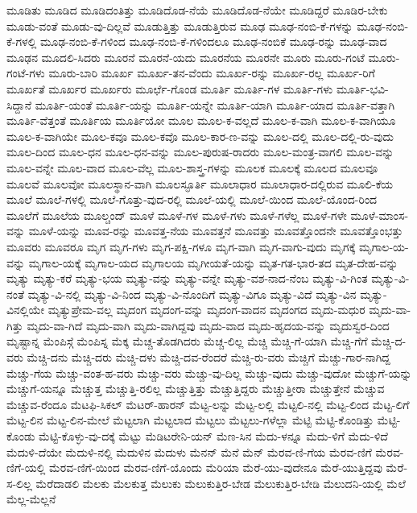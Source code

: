 {ಮೂಡಿತು
ಮೂಡಿದ
ಮೂಡಿದಂತಿತ್ತು
ಮೂಡಿದೊಡ-ನೆಯೆ
ಮೂಡಿದೊಡ-ನೆಯೇ
ಮೂಡಿದ್ದರೆ
ಮೂಡಿರ-ಬೇಕು
ಮೂಡು-ವಂತೆ
ಮೂಡು-ವು-ದಿಲ್ಲವೆ
ಮೂಡುತ್ತಿತ್ತು
ಮೂಡುತ್ತಿರುವ
ಮೂಢ
ಮೂಢ-ನಂಬಿ-ಕೆ-ಗಳನ್ನು
ಮೂಢ-ನಂಬಿ-ಕೆ-ಗಳಲ್ಲಿ
ಮೂಢ-ನಂಬಿ-ಕೆ-ಗಳಿಂದ
ಮೂಢ-ನಂಬಿ-ಕೆ-ಗಳಿಂದಲೂ
ಮೂಢ-ನಂಬಿಕೆ
ಮೂಢ-ರನ್ನು
ಮೂಢ-ವಾದ
ಮೂಢನ
ಮೂದಲಿ-ಸಿದರು
ಮೂರನೆ
ಮೂರನೆ-ಯದು
ಮೂರನೆಯ
ಮೂರನೇ
ಮೂರು
ಮೂರು-ಗಂಟೆ
ಮೂರು-ಗಂಟೆ-ಗಳು
ಮೂರು-ಬಾರಿ
ಮೂರ್ಖ
ಮೂರ್ಖ-ತನ-ವೆಂದು
ಮೂರ್ಖ-ರನ್ನು
ಮೂರ್ಖ-ರಲ್ಲ
ಮೂರ್ಖ-ರಿಗೆ
ಮೂರ್ಖತೆ
ಮೂರ್ಖರ
ಮೂರ್ಖರು
ಮೂರ್ಛೆ-ಗೊಂಡ
ಮೂರ್ತಿ
ಮೂರ್ತಿ-ಗಳ
ಮೂರ್ತಿ-ಗಳು
ಮೂರ್ತಿ-ಭವಿ-ಸಿದ್ದಾನೆ
ಮೂರ್ತಿ-ಯಂತೆ
ಮೂರ್ತಿ-ಯನ್ನು
ಮೂರ್ತಿ-ಯನ್ನೇ
ಮೂರ್ತಿ-ಯಾಗಿ
ಮೂರ್ತಿ-ಯಾದ
ಮೂರ್ತಿ-ವತ್ತಾಗಿ
ಮೂರ್ತಿ-ವೆತ್ತಂತೆ
ಮೂರ್ತಿಯ
ಮೂರ್ತಿಯೋ
ಮೂಲ
ಮೂಲ-ಕ-ವಲ್ಲದೆ
ಮೂಲ-ಕ-ವಾಗಿ
ಮೂಲ-ಕ-ವಾಗಿಯೂ
ಮೂಲ-ಕ-ವಾಗಿಯೇ
ಮೂಲ-ಕವೂ
ಮೂಲ-ಕವೊ
ಮೂಲ-ಕಾರ-ಣ-ವನ್ನು
ಮೂಲ-ದಲ್ಲಿ
ಮೂಲ-ದಲ್ಲಿ-ರು-ವುದು
ಮೂಲ-ದಿಂದ
ಮೂಲ-ಧನ
ಮೂಲ-ಧನ-ವನ್ನು
ಮೂಲ-ಪುರುಷ-ರಾದರು
ಮೂಲ-ಮಂತ್ರ-ವಾಗಲಿ
ಮೂಲ-ವನ್ನು
ಮೂಲ-ವನ್ನೇ
ಮೂಲ-ವಾದ
ಮೂಲ-ವೆಲ್ಲ
ಮೂಲ-ಶಾಸ್ತ್ರ-ಗಳನ್ನು
ಮೂಲಕ
ಮೂಲಕ್ಕೆ
ಮೂಲದ
ಮೂಲವೂ
ಮೂಲವೆ
ಮೂಲವೋ
ಮೂಲಸ್ಥಾನ-ವಾಗಿ
ಮೂಲಸ್ಫೂರ್ತಿ
ಮೂಲಾಧಾರ
ಮೂಲಾಧಾರ-ದಲ್ಲಿರುವ
ಮೂಲಿ-ಕೆಯ
ಮೂಲೆ
ಮೂಲೆ-ಗಳಲ್ಲಿ
ಮೂಲೆ-ಗೊತ್ತು-ವುದ-ರಲ್ಲಿ
ಮೂಲೆ-ಯಲ್ಲಿ
ಮೂಲೆ-ಯಿಂದ
ಮೂಲೆ-ಯೊಂದ-ರಿಂದ
ಮೂಲೆಗೆ
ಮೂಲೆಯ
ಮೂಲ್ಚಂದ್
ಮೂಳೆ
ಮೂಳೆ-ಗಳ
ಮೂಳೆ-ಗಳು
ಮೂಳೆ-ಗಳೆಲ್ಲ
ಮೂಳೆ-ಗಳೇ
ಮೂಳೆ-ಮಾಂಸ-ವನ್ನು
ಮೂಳೆ-ಯನ್ನು
ಮೂವ-ರನ್ನು
ಮೂವತ್ತ-ನೆಯ
ಮೂವತ್ತನೆ
ಮೂವತ್ತು
ಮೂವತ್ತೊಂದನೇ
ಮೂವತ್ತೊಂಭತ್ತು
ಮೂವರು
ಮೂವರೂ
ಮೃಗ
ಮೃಗ-ಗಳು
ಮೃಗ-ಪಕ್ಷಿ-ಗಳೂ
ಮೃಗ-ವಾಗಿ
ಮೃಗ-ವಾಗು-ವುದು
ಮೃಗಕ್ಕೆ
ಮೃಗಾಲ-ಯ-ವನ್ನು
ಮೃಗಾಲ-ಯಕ್ಕೆ
ಮೃಗಾಲ-ಯದ
ಮೃಗಾಲಯ
ಮೃಗೀಯತೆ-ಯನ್ನು
ಮೃತ-ಗತ-ಭಾರ-ತದ
ಮೃತ-ದೇಹ-ವನ್ನು
ಮೃತ್ಯು
ಮೃತ್ಯು-ಕರೆ
ಮೃತ್ಯು-ಭಯ
ಮೃತ್ಯು-ವನ್ನು
ಮೃತ್ಯು-ವನ್ನೇ
ಮೃತ್ಯು-ವಶ-ನಾದ-ನೆಂಬ
ಮೃತ್ಯು-ವಿ-ಗಿಂತ
ಮೃತ್ಯು-ವಿ-ನಂತೆ
ಮೃತ್ಯು-ವಿ-ನಲ್ಲಿ
ಮೃತ್ಯು-ವಿ-ನಿಂದ
ಮೃತ್ಯು-ವಿ-ನೊಂದಿಗೆ
ಮೃತ್ಯು-ವಿಗೂ
ಮೃತ್ಯು-ವಿದೆ
ಮೃತ್ಯು-ವಿನ
ಮೃತ್ಯು-ವಿನಲ್ಲಿಯೇ
ಮೃತ್ಯುಪ್ರೇಮ-ವಲ್ಲ
ಮೃದಂಗ
ಮೃದಂಗ-ವನ್ನು
ಮೃದಂಗ-ವಾದನ
ಮೃದಂಗದ
ಮೃದು-ಮಧುರ
ಮೃದು-ವಾ-ಗಿತ್ತು
ಮೃದು-ವಾ-ಗಿದೆ
ಮೃದು-ವಾಗಿ
ಮೃದು-ವಾಗಿದ್ದವು
ಮೃದು-ವಾದ
ಮೃದು-ಹೃದಯ-ವನ್ನು
ಮೃದುಸ್ವರ-ದಿಂದ
ಮೃಷ್ಟಾನ್ನ
ಮೆಂಪಿಸ್ಗೆ
ಮೆಂಪಿಸ್ನ
ಮೆಕ್ಕ
ಮೆಚ್ಚ-ತೊಡಗಿದರು
ಮೆಚ್ಚ-ಲಿಲ್ಲ
ಮೆಚ್ಚಿ
ಮೆಚ್ಚಿ-ಗೆ-ಯಾಗಿ
ಮೆಚ್ಚಿ-ಗೆಗೆ
ಮೆಚ್ಚಿ-ದ-ವರು
ಮೆಚ್ಚಿ-ದನು
ಮೆಚ್ಚಿ-ದರು
ಮೆಚ್ಚಿ-ದಳು
ಮೆಚ್ಚಿ-ದವ-ರೆಂದರೆ
ಮೆಚ್ಚಿ-ರು-ವರು
ಮೆಚ್ಚಿಗೆ
ಮೆಚ್ಚು-ಗಾರ-ನಾಗಿದ್ದ
ಮೆಚ್ಚು-ಗೆಯ
ಮೆಚ್ಚು-ವಂತ-ಹ-ವರು
ಮೆಚ್ಚು-ವರು
ಮೆಚ್ಚು-ವು-ದಿಲ್ಲ
ಮೆಚ್ಚು-ವುದು
ಮೆಚ್ಚು-ವುದೋ
ಮೆಚ್ಚುಗೆ-ಯನ್ನು
ಮೆಚ್ಚುಗೆ-ಯನ್ನೂ
ಮೆಚ್ಚುತ್ತ
ಮೆಚ್ಚುತ್ತಿ-ರಲಿಲ್ಲ
ಮೆಚ್ಚುತ್ತಿತ್ತು
ಮೆಚ್ಚುತ್ತಿದ್ದರು
ಮೆಚ್ಚುತ್ತೀರಾ
ಮೆಚ್ಚುತ್ತೇನೆ
ಮೆಚ್ಚುವ
ಮೆಚ್ಚುವ-ರೆಂದೂ
ಮೆಟಫಿ-ಸಿಕಲ್
ಮೆಟರ್-ಹಾರನ್
ಮೆಟ್ಟ-ಲನ್ನು
ಮೆಟ್ಟ-ಲಲ್ಲಿ
ಮೆಟ್ಟಲಿ-ನಲ್ಲಿ
ಮೆಟ್ಟ-ಲಿಂದ
ಮೆಟ್ಟ-ಲಿಗೆ
ಮೆಟ್ಟ-ಲಿನ
ಮೆಟ್ಟ-ಲಿನ-ಮೇಲೆ
ಮೆಟ್ಟಲಾಗಿ
ಮೆಟ್ಟಲಾದ
ಮೆಟ್ಟಲು
ಮೆಟ್ಟಲು-ಗಳೆಲ್ಲಾ
ಮೆಟ್ಟಿ
ಮೆಟ್ಟಿ-ಕೊಂಡಿತ್ತು
ಮೆಟ್ಟಿ-ಕೊಂಡು
ಮೆಟ್ಟಿ-ಕೊಳ್ಳು-ವು-ದಕ್ಕೆ
ಮೆಟ್ಟು
ಮೆಡಿಟರೇನಿ-ಯನ್
ಮೆಣ-ಸಿನ
ಮೆದು-ಳನ್ನೂ
ಮೆದು-ಳಿಗೆ
ಮೆದು-ಳಿದೆ
ಮೆದುಳಿ-ದೆಯೇ
ಮೆದುಳಿ-ನಲ್ಲಿ
ಮೆದುಳಿನ
ಮೆದುಳು
ಮೆನನ್
ಮೆನೆ
ಮೆನ್
ಮೆರವ-ಣಿ-ಗೆಯ
ಮೆರವ-ಣಿಗೆ
ಮೆರವ-ಣಿಗೆ-ಯಲ್ಲಿ
ಮೆರವ-ಣಿಗೆ-ಯಿಂದ
ಮೆರವ-ಣಿಗೆ-ಯೊಂದು
ಮೆರಿಯಾ
ಮೆರೆ-ಯು-ವುದೇನೂ
ಮೆರೆ-ಯುತ್ತಿದ್ದವು
ಮೆರೆ-ಸ-ಲಿಲ್ಲ
ಮೆರೆದಾಡಲಿ
ಮೆಲಕು
ಮೆಲಕುತ್ತ
ಮೆಲುಕು
ಮೆಲುಕುತ್ತಿರ-ಬೇಡ
ಮೆಲುಕುತ್ತಿರ-ಬೇಡಿ
ಮೆಲುದನಿ-ಯಲ್ಲಿ
ಮೆಲೆ
ಮೆಲ್ಲ-ಮೆಲ್ಲನೆ
}

